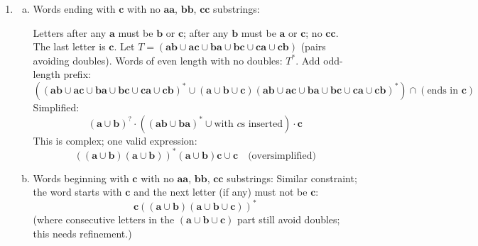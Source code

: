 \begin{enumerate}[{6.}1.]
From the $X_1$ equation (by Theorem~6.1, $\lambda\notin\{\pmb{0}\}$):
$X_1=\pmb{0}^*(\epsilon\cup\pmb{1}^*\pmb{01}X_0)=\pmb{0}^*\cup\pmb{0}^*\pmb{1}^*\pmb{01}X_0$.

Substitute into $X_0$:
$X_0=\pmb{0}^*\pmb{1}\cup(\pmb{10})^*X_0\cup\pmb{0}(\pmb{0}\cup\pmb{1})(\pmb{0}^*\cup\pmb{0}^*\pmb{1}^*\pmb{01}X_0)$.

Let $C=\pmb{0}(\pmb{0}\cup\pmb{1})\pmb{0}^*\pmb{1}^*\pmb{01}$. Then:
$X_0=((\pmb{10})^*\cup C)X_0\cup(\pmb{0}^*\pmb{1}\cup\pmb{0}(\pmb{0}\cup\pmb{1})\pmb{0}^*)$.

By Theorem~6.1 (check $\lambda\notin(\pmb{10})^*\cup C$... $\lambda\in(\pmb{10})^*$!).  If $\lambda$ appears in the coefficient of $X_0$, uniqueness fails.  The minimal solution is:
$X_0=((\pmb{10})^*\cup C)^*(\pmb{0}^*\pmb{1}\cup\pmb{0}(\pmb{0}\cup\pmb{1})\pmb{0}^*)$.

Then back-substitute to get $X_1$.

\item \begin{enumerate}[(a)]
  \item Words ending with $\pmb{c}$ with no $\pmb{aa}$, $\pmb{bb}$, $\pmb{cc}$ substrings:

  Letters after any $\pmb{a}$ must be $\pmb{b}$ or $\pmb{c}$; after any $\pmb{b}$ must be $\pmb{a}$ or $\pmb{c}$; no $\pmb{cc}$.  The last letter is $\pmb{c}$.  Let $T=(\pmb{ab}\cup\pmb{ac}\cup\pmb{ba}\cup\pmb{bc}\cup\pmb{ca}\cup\pmb{cb})$ (pairs avoiding doubles).  Words of even length with no doubles: $T^*$.  Add odd-length prefix:
  \[
    ((\pmb{ab}\cup\pmb{ac}\cup\pmb{ba}\cup\pmb{bc}\cup\pmb{ca}\cup\pmb{cb})^*\cup(\pmb{a}\cup\pmb{b}\cup\pmb{c})(\pmb{ab}\cup\pmb{ac}\cup\pmb{ba}\cup\pmb{bc}\cup\pmb{ca}\cup\pmb{cb})^*)\cap(\text{ends in }\pmb{c})
  \]
  Simplified:
  \[
    (\pmb{a}\cup\pmb{b})^?\cdot((\pmb{ab}\cup\pmb{ba})^*\cup\text{with }c\text{s inserted})\cdot\pmb{c}
  \]
  This is complex; one valid expression:
  \[
    ((\pmb{a}\cup\pmb{b})(\pmb{a}\cup\pmb{b}))^*(\pmb{a}\cup\pmb{b})\pmb{c}\cup\pmb{c}
    \quad\text{(oversimplified)}
  \]

  \item Words beginning with $\pmb{c}$ with no $\pmb{aa}$, $\pmb{bb}$, $\pmb{cc}$ substrings:
  Similar constraint; the word starts with $\pmb{c}$ and the next letter (if any) must not be $\pmb{c}$:
  \[
    \pmb{c}((\pmb{a}\cup\pmb{b})(\pmb{a}\cup\pmb{b}\cup\pmb{c}))^*
  \]
  (where consecutive letters in the $(\pmb{a}\cup\pmb{b}\cup\pmb{c})$ part still avoid doubles; this needs refinement.)
\end{enumerate}


\end{enumerate}
